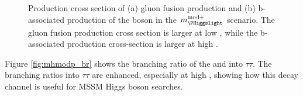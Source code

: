 \begin{figure}[h!]
\begin{center}
\end{center}
\caption[Production cross sections of  gluon fusion and b-associated
production of the \PHiggs boson in the $m_{\PHiggslight}^{\text{mod+}}$ scenario.]{Production cross section of (a) gluon fusion production and (b) b-associated production of the \PHiggs boson
in the $m_{\PHiggslight}^{\text{mod+}}$ scenario. The gluon fusion production cross section is larger at low \tanb, while
the b-associated production cross-section is larger at high \tanb.}
\label{fig:mhmodp_xs}
\end{figure}

Figure \ref{fig:mhmodp_br} shows the branching ratio of the \PHiggs and \PHiggsps 
into $\tau\tau$. The branching ratios into $\tau\tau$ are enhanced, especially at
high \tanb, showing how this decay channel is useful for MSSM Higgs boson searches.

